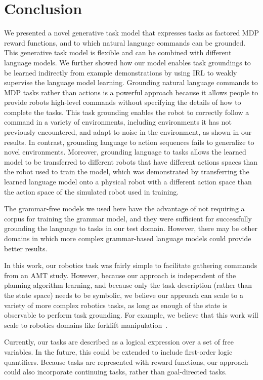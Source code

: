\documentclass[conference]{IEEEtran}
\begin{document}
\section{Conclusion}
We presented a novel generative task model that expresses tasks as factored MDP reward functions, and to which natural language commands can be grounded. This generative task model is flexible and can be combined with different language models. We further showed how our model enables task groundings to be learned indirectly from example demonstrations by using IRL to weakly supervise the language model learning. Grounding natural language commands to MDP tasks rather than actions is a powerful approach because it allows people to provide robots high-level commands without specifying the details of how to complete the tasks. This task grounding enables the robot to correctly follow a command in a variety of environments, including environments it has not previously encountered, and adapt to noise in the environment, as shown in our results. In contrast, grounding language to action sequences fails to generalize to novel environments. Moreover, grounding language to tasks allows the learned model to be transferred to different robots that have different actions spaces than the robot used to train the model, which was demonstrated by transferring the learned language model onto a physical robot with a different action space than the action space of the simulated robot used in training.

The grammar-free models we used here have the advantage of not requiring a corpus for training the grammar model, and they were sufficient for successfully grounding the language to tasks in our test domain. However, there may be other domains in which more complex grammar-based language models could provide better results. 

In this work, our robotics task was fairly simple to facilitate gathering commands from an AMT study. However, because our approach is independent of the planning algorithm learning, and because only the task description (rather than the state space) needs to be symbolic, we believe our approach can scale to a variety of more complex robotics tasks, as long as enough of the state is observable to perform task grounding. For example, we believe that this work will scale to robotics domains like forklift manipulation~\cite{teller2010voice}.

Currently, our tasks are described as a logical expression over a set of free variables. In the future, this could be extended to include first-order logic quantifiers. Because tasks are represented with reward functions, our approach could also incorporate continuing tasks, rather than goal-directed tasks.
\end{document}

